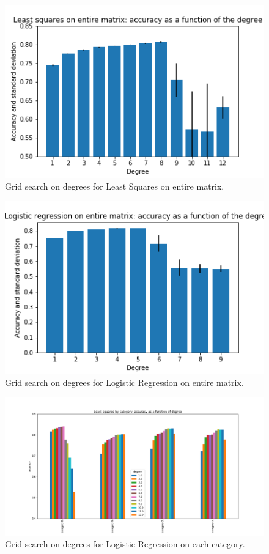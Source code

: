 \documentclass[10pt,conference,compsocconf]{IEEEtran}
\begin{document}
\begin{figure}[tbp]
  \centering
  \includegraphics[width=\columnwidth]{ls_deg}
  \caption{Grid search on degrees for Least Squares on entire matrix.}
  \vspace{-3mm}
  \label{fig:denoise-fourier}
\end{figure}
\begin{figure}[tbp]
  \centering
  \includegraphics[width=\columnwidth]{lr_deg}
  \caption{Grid search on degrees for Logistic Regression on entire matrix.}
  \vspace{-3mm}
  \label{fig:denoise-fourier}
\end{figure}
\begin{figure}[tbp]
  \centering
  \includegraphics[width=\columnwidth]{ls_cat_deg}
  \caption{Grid search on degrees for Logistic Regression on each category.}
  \vspace{-3mm}
  \label{fig:denoise-fourier}
\end{figure}
\end{document}
